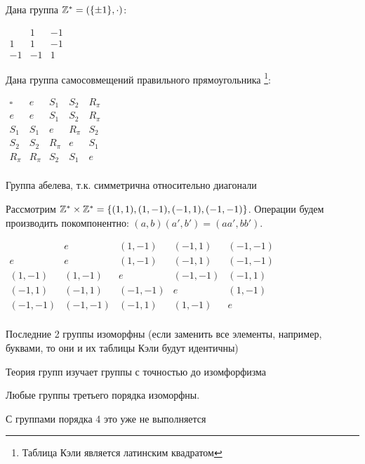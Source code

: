 \documentclass[main]{subfiles}
\begin{document}
Дана группа $\mathbb{Z}^* = (\{ \pm 1\}, \cdot)$:

\begin{center}
    $\begin{array}{c|cc}
               & 1  & -1 \\
            \hline
            1  & 1  & -1 \\
            -1 & -1 & 1
        \end{array}$
\end{center}

Дана группа самосовмещений правильного прямоугольника%
\footnote{Таблица Кэли является латинским квадратом}:
\begin{center}
    $\begin{array}{c|cccc}
            \square & e     & S_1   & S_2   & R_\pi \\
            \hline
            e       & e     & S_1   & S_2   & R_\pi \\
            S_1     & S_1   & e     & R_\pi & S_2   \\
            S_2     & S_2   & R_\pi & e     & S_1   \\
            R_\pi   & R_\pi & S_2   & S_1   & e     \\
        \end{array}$
\end{center}
Группа абелева, т.к. симметрична относительно диагонали

Рассмотрим $\mathbb{Z}^* \times \mathbb{Z}^* = \{(1,1), (1, -1), (-1,1), (-1,-1)\}$.
Операции будем производить покомпонентно: $(a,b)(a', b')= (aa', bb')$.
\begin{center}
    $\begin{array}{c|cccc}
                    & e       & (1, -1) & (-1,1)  & (-1,-1) \\
            \hline
            e       & e       & (1, -1) & (-1,1)  & (-1,-1) \\
            (1,-1)  & (1, -1) & e       & (-1,-1) & (-1,1)  \\
            (-1,1)  & (-1,1)  & (-1,-1) & e       & (1, -1) \\
            (-1,-1) & (-1,-1) & (-1,1)  & (1, -1) & e       \\
        \end{array}$
\end{center}

Последние 2 группы изоморфны (если заменить все элементы, например, буквами,
то они и их таблицы Кэли будут идентичны)

Теория групп изучает группы с точностью до изомфорфизма

\begin{axiom}
    Любые группы третьего порядка изоморфны.
\end{axiom}

С группами порядка 4 это уже не выполняется
\end{document}
